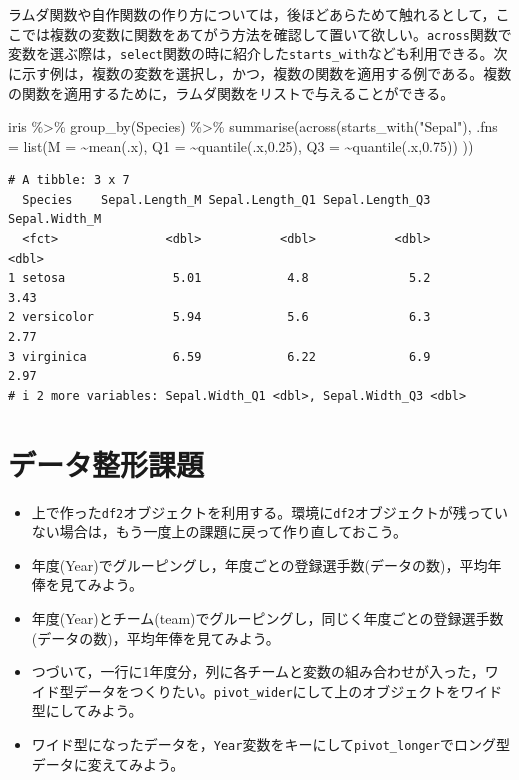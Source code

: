 \documentclass[
  a4paper,
]{ltjsbook}
\newenvironment{Shaded}{\begin{snugshade}}{\end{snugshade}}
\newcommand{\AttributeTok}[1]{\textcolor[rgb]{0.40,0.45,0.13}{#1}}
\newcommand{\FloatTok}[1]{\textcolor[rgb]{0.68,0.00,0.00}{#1}}
\newcommand{\FunctionTok}[1]{\textcolor[rgb]{0.28,0.35,0.67}{#1}}
\newcommand{\NormalTok}[1]{\textcolor[rgb]{0.00,0.23,0.31}{#1}}
\newcommand{\SpecialCharTok}[1]{\textcolor[rgb]{0.37,0.37,0.37}{#1}}
\newcommand{\StringTok}[1]{\textcolor[rgb]{0.13,0.47,0.30}{#1}}
\providecommand{\tightlist}{%
  \setlength{\itemsep}{0pt}\setlength{\parskip}{0pt}}\usepackage{longtable,booktabs,array}
\begin{document}
ラムダ関数や自作関数の作り方については，後ほどあらためて触れるとして，ここでは複数の変数に関数をあてがう方法を確認して置いて欲しい。\texttt{across}関数で変数を選ぶ際は，\texttt{select}関数の時に紹介した\texttt{starts\_with}なども利用できる。次に示す例は，複数の変数を選択し，かつ，複数の関数を適用する例である。複数の関数を適用するために，ラムダ関数をリストで与えることができる。

\begin{Shaded}
\begin{Highlighting}[]
\NormalTok{iris }\SpecialCharTok{\%\textgreater{}\%} 
  \FunctionTok{group\_by}\NormalTok{(Species)  }\SpecialCharTok{\%\textgreater{}\%} 
  \FunctionTok{summarise}\NormalTok{(}\FunctionTok{across}\NormalTok{(}\FunctionTok{starts\_with}\NormalTok{(}\StringTok{"Sepal"}\NormalTok{),}
            \AttributeTok{.fns =} \FunctionTok{list}\NormalTok{(}\AttributeTok{M  =} \SpecialCharTok{\textasciitilde{}}\FunctionTok{mean}\NormalTok{(.x),}
                        \AttributeTok{Q1 =} \SpecialCharTok{\textasciitilde{}}\FunctionTok{quantile}\NormalTok{(.x,}\FloatTok{0.25}\NormalTok{),}
                        \AttributeTok{Q3 =} \SpecialCharTok{\textasciitilde{}}\FunctionTok{quantile}\NormalTok{(.x,}\FloatTok{0.75}\NormalTok{))}
\NormalTok{            ))}
\end{Highlighting}
\end{Shaded}

\begin{verbatim}
# A tibble: 3 x 7
  Species    Sepal.Length_M Sepal.Length_Q1 Sepal.Length_Q3 Sepal.Width_M
  <fct>               <dbl>           <dbl>           <dbl>         <dbl>
1 setosa               5.01            4.8              5.2          3.43
2 versicolor           5.94            5.6              6.3          2.77
3 virginica            6.59            6.22             6.9          2.97
# i 2 more variables: Sepal.Width_Q1 <dbl>, Sepal.Width_Q3 <dbl>
\end{verbatim}

\section{データ整形課題}\label{ux30c7ux30fcux30bfux6574ux5f62ux8ab2ux984c}

\begin{itemize}
\tightlist
\item
  上で作った\texttt{df2}オブジェクトを利用する。環境に\texttt{df2}オブジェクトが残っていない場合は，もう一度上の課題に戻って作り直しておこう。
\item
  年度(Year)でグルーピングし，年度ごとの登録選手数(データの数)，平均年俸を見てみよう。
\item
  年度(Year)とチーム(team)でグルーピングし，同じく年度ごとの登録選手数(データの数)，平均年俸を見てみよう。
\item
  つづいて，一行に1年度分，列に各チームと変数の組み合わせが入った，ワイド型データをつくりたい。\texttt{pivot\_wider}にして上のオブジェクトをワイド型にしてみよう。
\item
  ワイド型になったデータを，\texttt{Year}変数をキーにして\texttt{pivot\_longer}でロング型データに変えてみよう。
\end{itemize}
\end{document}

